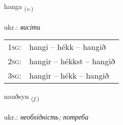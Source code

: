 \documentclass[frontgrid, backgrid]{flacards}\usepackage[]{graphicx}\usepackage[]{xcolor}
\begin{document}
\renewcommand{\blhead}{\vskip5pt {\small\bfseries\footnotesize Sagnorð | дієслово }}
\renewcommand{\bcfoot}{\vskip5pt \hspace{2pt}{\small\bfseries\footnotesize 2K}}


{hanga \small{\textsubscript{(\textit{v.})}} \\[1ex] %
\textphonetic{[hauŋka]} \\
ukr.: \emph{висіти} \\  [2ex]
\renewcommand*{\arraystretch}{0.8}
\begin{tabular}{p{1cm}l}
\textsc{1sg}: & hangi -- hékk -- hangið \\ 
\textsc{2sg}: & hangir -- hékkst -- hangið \\ 
\textsc{3sg}: & hangir -- hékk -- hangið \\ 
\end{tabular}
}

\renewcommand{\flhead}{\vskip5pt \fboxsep=0pt {\small\bfseries\footnotesize Nafnorð | іменник}}
\renewcommand{\fcfoot}{\vskip5pt \fboxsep=0pt \hspace{2pt}{\small\bfseries\footnotesize 2K}}

\renewcommand{\blhead}{\vskip5pt {\small\bfseries\footnotesize Nafnorð | іменник }}
\renewcommand{\bcfoot}{\vskip5pt \hspace{2pt}{\small\bfseries\footnotesize 2K}}


{nauðsyn \small{\textsubscript{(\textit{f.})}} \\[1ex] %
\textphonetic{[nœiðsɪn]} \\
ukr.: \emph{необхідність; потреба} \\  [2ex]
\renewcommand*{\arraystretch}{0.8}
}
\end{document}

